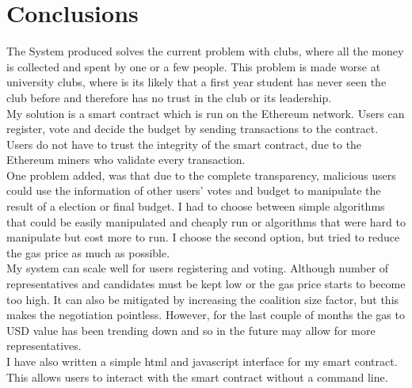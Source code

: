 \chapter{Conclusions} \label{Chapter: Conclusions}
The System produced solves the current problem with clubs, where all the money is collected and spent by one or a few people. This problem is made worse at university clubs, where is its likely that a first year student has never seen the club before and therefore has no trust in the club or its leadership.  \\
My solution is a smart contract which is run on the Ethereum network. Users can register, vote and decide the budget by sending transactions to the contract. Users do not have to trust the integrity of the smart contract, due to the Ethereum miners who validate every transaction. \\
One problem added, was that due to the complete transparency, malicious users could use the information of other users' votes and budget to manipulate the result of a election or final budget. I had to choose between simple algorithms that could be easily manipulated and cheaply run or algorithms that were hard to manipulate but cost more to run. I choose the second option, but tried to reduce the gas price as much as possible. \\
My system can scale well for users registering and voting. Although number of representatives and candidates must be kept low or the gas price starts to become too high. It can also be mitigated by increasing the coalition size factor, but this makes the negotiation pointless. However, for the last couple of months the gas to USD value has been trending down and so in the future may allow for more representatives. \\
I have also written a simple html and javascript interface for my smart contract. This allows users to interact with the smart contract without a command line. 
